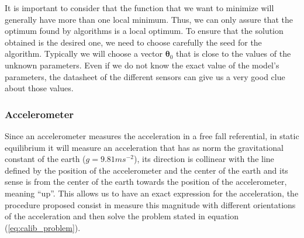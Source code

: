\documentclass[conference]{IEEEtran}
\newcommand{\refp}[1]{(\ref{#1})}
\begin{document}
It is important to consider that the function that we want to minimize will generally have more than one local minimum. Thus, we can only assure that the optimum found by algorithms is a local optimum. To ensure that the solution obtained is the desired one, we need to choose carefully the seed for the algorithm. Typically we will choose a vector $\boldsymbol{\theta}_0$ that is close to the values of the unknown parameters. Even if we do not know the exact value of the model's parameters, the datasheet of the different sensors can give us a very good clue about those values.\\

\subsubsection{Accelerometer}
\label{subsec:acc}
Since an accelerometer measures the acceleration in a free fall referential, in static equilibrium it will measure an acceleration that has as norm the gravitational constant of the  earth ($g = 9.81ms^{-2}$), its direction is collinear with the line defined by the position of the accelerometer and the center of the earth and its sense is from the center of the earth towards the position of the accelerometer, meaning ``up''. This allows us to have an exact expression for the acceleration, the procedure proposed consist in measure this magnitude with different orientations of the acceleration and then solve the problem stated in equation \refp{eq:calib_problem}.\\
\end{document}
